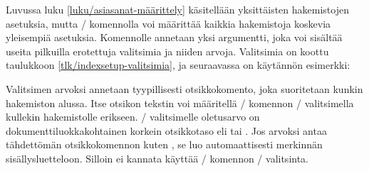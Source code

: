 \begin{koodilohkosis}
\printindex            %
\printindex[henkilöt]  %
\end{koodilohkosis}

\noindent
Luvussa luku \ref{luku/asiasanat-määrittely} käsitellään yksittäisten
hakemistojen asetuksia, mutta \-/ komennolla voi
määrittää kaikkia hakemistoja koskevia yleisempiä asetuksia. Komennolle
annetaan yksi argumentti, joka voi sisältää useita pilkuilla erotettuja
valitsimia ja niiden arvoja. Valitsimia on koottu taulukkoon
\ref{tlk/indexsetup-valitsimia}, ja seuraavassa on käytännön esimerkki:

\begin{koodilohkosis}
\end{koodilohkosis}


\noindent
Valitsimen  arvoksi annetaan tyypillisesti otsikkokomento,
joka suoritetaan kunkin hakemiston alussa. Itse otsikon tekstin voi
määritellä \-/ komennon \-/ valitsimella
kullekin hakemistolle erikseen. \-/ valitsimelle oletusarvo
on dokumenttiluokkakohtainen korkein otsikkotaso eli 
tai . Jos arvoksi antaa tähdettömän otsikkokomennon
kuten , se luo automaattisesti merkinnän
sisällysluetteloon. Silloin ei kannata käyttää \-/
komennon \-/ valitsinta.

